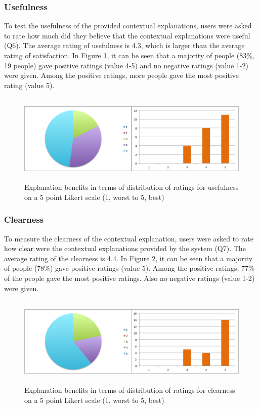 \subsubsection{Usefulness} \label{sec:results_eb_u}

To test the usefulness of the provided contextual explanations, users were asked to rate how much did they believe that the contextual explanations were useful (Q6). The average rating of usefulness is 4.3, which is larger than the average rating of satisfaction. In Figure \ref{fig:usefulness}, it can be seen that a majority of people (83\%, 19 people) gave positive ratings (value 4-5) and no negative ratings (value 1-2) were given. Among the positive ratings, more people gave the most positive rating (value 5).

\begin{figure}[H]
	\centering
	\includegraphics[height=1.7in]{figures/usefulness.png}
	\caption{Explanation benefits in terms of distribution of ratings for usefulness on a 5 point Likert scale (1, worst to 5, best)}
	\label{fig:usefulness}
\end{figure}

\subsubsection{Clearness} \label{sec:results_eb_c}

To measure the clearness of the contextual explanation, users were asked to rate how clear were the contextual explanations provided by the system (Q7). The average rating of the clearness is 4.4. In Figure \ref{fig:clearness}, it can be seen that a majority of people (78\%) gave positive ratings (value 5). Among the positive ratings, 77\% of the people gave the most positive ratings. Also no negative ratings (value 1-2) were given. 

\begin{figure}[H]
	\centering
	\includegraphics[height=1.7in]{figures/clearness.png}
	\caption{Explanation benefits in terms of distribution of ratings for clearness on a 5 point Likert scale (1, worst to 5, best)}
	\label{fig:clearness}
\end{figure}

